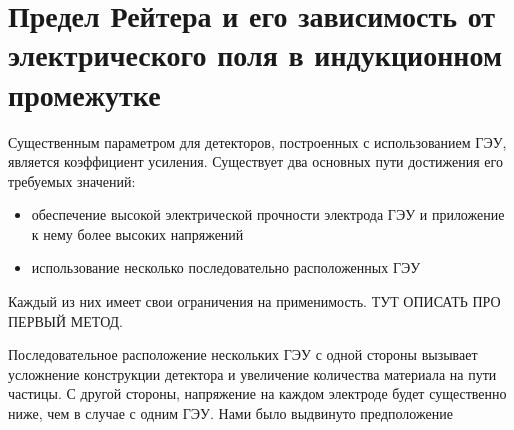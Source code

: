 \section{Предел Рейтера и его зависимость от электрического поля в индукционном промежутке}
\label{sec:raether_exp}
Существенным параметром для детекторов, построенных с использованием ГЭУ, является коэффициент усиления. Существует два основных пути достижения его требуемых значений: 
\begin{itemize}
	\item обеспечение высокой электрической прочности электрода ГЭУ и приложение к нему более высоких напряжений
	\item использование несколько последовательно расположенных ГЭУ
\end{itemize}
Каждый из них имеет свои ограничения на применимость. ТУТ ОПИСАТЬ ПРО ПЕРВЫЙ МЕТОД.\par
Последовательное расположение нескольких ГЭУ с одной стороны вызывает усложнение конструкции детектора и увеличение количества материала на пути частицы. С другой стороны, напряжение на каждом электроде будет существенно ниже, чем в случае с одним ГЭУ. Нами было выдвинуто предположение